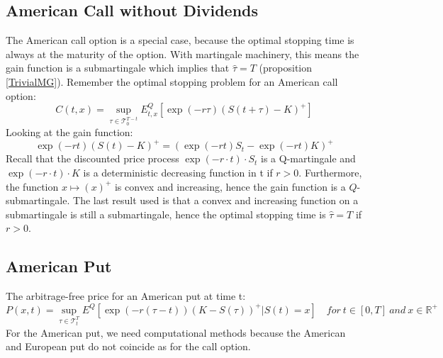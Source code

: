 \subsection{American Call without Dividends}\label{AmericanCall}
The American call option is a special case, because the optimal stopping time is always at the maturity of the option. With martingale machinery, this means the gain function is a submartingale which implies that $\hat{\tau}=T$ (proposition \ref{TrivialMG}). Remember the optimal stopping problem for an American call option:
$$C(t,x)=\sup_{\tau \in \mathcal{T}_0^{T-t}} E_{t,x}^Q[\exp(-r\tau) (S(t+\tau)-K)^+]$$
Looking at the gain function:
\begin{equation*}
\exp(-r t) (S(t)-K)^+ = (\exp(-r t) S_{t} - \exp(-r t) K)^+
\end{equation*}
Recall that the discounted price process $\exp(-r\cdot t) \cdot S_t$ is a Q-martingale and $\exp(-r\cdot t) \cdot K$ is a deterministic decreasing function in t if $r>0$. Furthermore, the function $x \mapsto (x)^+$ is convex and increasing, hence the gain function is a $Q$-submartingale. The last result used is that a convex and increasing function on a submartingale is still a submartingale, hence the optimal stopping time is $\hat{\tau}=T$ if $r>0$.

\subsection{American Put}\label{americanPut}
The arbitrage-free price for an American put at time t:
\begin{equation*}\label{AmericanPutPrice}
P(x,t)=\sup_{\tau \in \mathcal{T}_t^T} E^Q[\exp(-r(\tau-t)) (K-S(\tau))^+|S(t)=x] \quad for \ t\in [0,T] \ and \ x\in\mathbb{R}^+
\end{equation*}
For the American put, we need computational methods because the American and European put do not coincide as for the call option.


